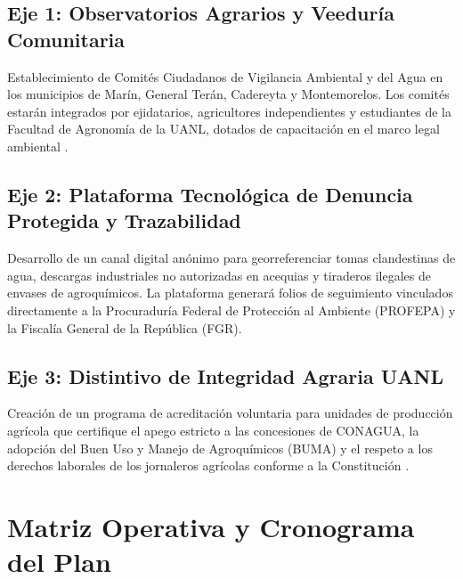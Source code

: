 \documentclass[spanish,letterpaper,oneside]{article}
\begin{document}
\subsection{Eje 1: Observatorios Agrarios y Veeduría Comunitaria}
Establecimiento de Comités Ciudadanos de Vigilancia Ambiental y del Agua en los municipios de Marín, General Terán, Cadereyta y Montemorelos. Los comités estarán integrados por ejidatarios, agricultores independientes y estudiantes de la Facultad de Agronomía de la UANL, dotados de capacitación en el marco legal ambiental \parencite{uanl_codigo2021}.

\subsection{Eje 2: Plataforma Tecnológica de Denuncia Protegida y Trazabilidad}
Desarrollo de un canal digital anónimo para georreferenciar tomas clandestinas de agua, descargas industriales no autorizadas en acequias y tiraderos ilegales de envases de agroquímicos. La plataforma generará folios de seguimiento vinculados directamente a la Procuraduría Federal de Protección al Ambiente (PROFEPA) y la Fiscalía General de la República (FGR).

\subsection{Eje 3: Distintivo de Integridad Agraria UANL}
Creación de un programa de acreditación voluntaria para unidades de producción agrícola que certifique el apego estricto a las concesiones de CONAGUA, la adopción del Buen Uso y Manejo de Agroquímicos (BUMA) y el respeto a los derechos laborales de los jornaleros agrícolas conforme a la Constitución \parencite{cpeum2024}.

\section{Matriz Operativa y Cronograma del Plan}
\end{document}
